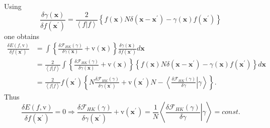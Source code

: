 \documentclass[aps,preprint]{revtex4}%
\begin{document}
Using
\begin{equation}
\frac{\delta\gamma\left(  \mathbf{x}\right)  }{\delta f\left(  \mathbf{x}%
^{\prime}\right)  }=\frac{2}{\left\langle f|f\right\rangle }\left\{  f\left(
\mathbf{x}\right)  N\delta\left(  \mathbf{x-x}^{\prime}\right)  -\gamma\left(
\mathbf{x}\right)  f\left(  \mathbf{x}^{\prime}\right)  \right\}
\end{equation}
one obtains
\begin{align}
\frac{\delta E\left(  f\mathbf{,}\mathrm{v}\right)  }{\delta f\left(
\mathbf{x}^{\prime}\right)  }  &  =\int\left\{  \frac{\delta\mathcal{F}%
_{HK}\left(  \gamma\right)  }{\delta\gamma\left(  \mathbf{x}\right)
}+\mathrm{v}\left(  \mathbf{x}\right)  \right\}  \frac{\delta\gamma\left(
\mathbf{x}\right)  }{\delta f\left(  \mathbf{x}^{\prime}\right)  }%
d\mathbf{x}\nonumber\\
&  =\frac{2}{\left\langle f|f\right\rangle }\int\left\{  \frac{\delta
\mathcal{F}_{HK}\left(  \gamma\right)  }{\delta\gamma\left(  \mathbf{x}%
\right)  }+\mathrm{v}\left(  \mathbf{x}\right)  \right\}  \left\{  f\left(
\mathbf{x}\right)  N\delta\left(  \mathbf{x-x}^{\prime}\right)  -\gamma\left(
\mathbf{x}\right)  f\left(  \mathbf{x}^{\prime}\right)  \right\}
d\mathbf{x}\nonumber\\
&  =\frac{2}{\left\langle f|f\right\rangle }f\left(  \mathbf{x}^{\prime
}\right)  \left\{  N\frac{\delta\mathcal{F}_{HK}\left(  \gamma\right)
}{\delta\gamma\left(  \mathbf{x}^{\prime}\right)  }+\mathrm{v}\left(
\mathbf{x}^{\prime}\right)  N-\left\langle \left.  \frac{\delta\mathcal{F}%
_{HK}\left(  \gamma\right)  }{\delta\gamma}\right\vert \gamma\right\rangle
\right\}  .
\end{align}
Thus%
\begin{equation}
\frac{\delta E\left(  f\mathbf{,}\mathrm{v}\right)  }{\delta f\left(
\mathbf{x}^{\prime}\right)  }=0\Rightarrow\frac{\delta\mathcal{F}_{HK}\left(
\gamma\right)  }{\delta\gamma\left(  \mathbf{x}^{\prime}\right)  }%
+\mathrm{v}\left(  \mathbf{x}^{\prime}\right)  =\frac{1}{N}\left\langle
\left.  \frac{\delta\mathcal{F}_{HK}\left(  \gamma\right)  }{\delta\gamma
}\right\vert \gamma\right\rangle =const.
\end{equation}
\end{document}
